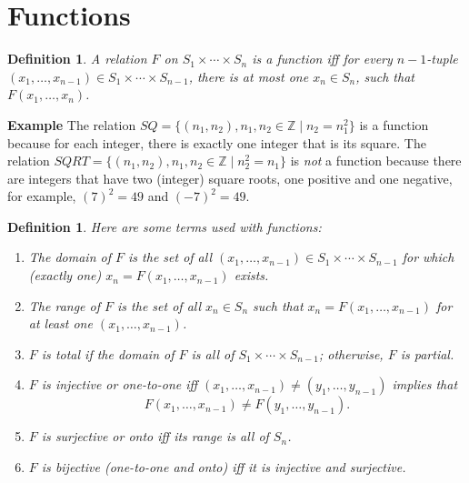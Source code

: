 \documentclass[12pt,a4paper]{article}
\newtheorem{definition}[theorem]{Definition}
\newenvironment{example}{\textbf{Example}}{}
\begin{document}
\section{Functions}\label{s.function}

\begin{definition}\label{def.relfunc}
A relation $F$ on $S_{1}\times \cdots \times S_{n}$ is a \emph{function}  iff for every $n\!\!-\!\!1$-tuple $(x_{1},\ldots,x_{n-1})\in S_{1}\times \cdots \times S_{n-1}$, there is at most one $x_{n}\in S_{n}$, such that $F(x_{1},\ldots,x_{n})$.
\end{definition}

\smallskip

\begin{example}
The relation $SQ = \{(n_1,n_2),n_1,n_2\in \mathbb{Z}\mid  n_2=n_1^2\}$ is a function because for each integer, there is exactly one integer that is its square. The relation $SQRT = \{(n_1,n_2),n_1,n_2\in \mathbb{Z}\mid n_2^2=n_1\}$ is \emph{not} a function because there are integers that have two (integer) square roots, one positive and one negative, for example, $(7)^2=49$ and $(-7)^2=49$.
\end{example}

\begin{definition}
Here are some terms used with functions:
\begin{enumerate}
\item The \emph{domain} of $F$ is the
set of all $(x_{1},\ldots,x_{n-1})\in S_{1}\times \cdots \times
S_{n-1}$ for which (exactly one)
\(x_{n}=F(x_{1},\ldots,x_{n-1})\) exists.

\item The \emph{range} of $F$ is the set
of all $x_{n}\in S_{n}$ such that
\(x_{n}=F(x_{1},\ldots,x_{n-1})\) for at least one
$(x_{1},\ldots,x_{n-1})$.

\item $F$ is \emph{total} if the domain of $F$ is
all of $S_{1}\times \cdots \times S_{n-1}$; otherwise, $F$
is \emph{partial}.

\item $F$ is \emph{injective} or \emph{one-to-one} iff
$(x_{1},\ldots,x_{n-1}) \neq (y_{1},\ldots,y_{n-1})$ implies that
\[F(x_{1},\ldots,x_{n-1}) \neq
F(y_{1},\ldots,y_{n-1}).\]

\item $F$ is \emph{surjective} or \emph{onto} iff its range is
all of $S_{n}$.

\item $F$ is \emph{bijective} (\emph{one-to-one and onto}) iff it
is injective and surjective.
\end{enumerate}
\end{definition}
\end{document}
